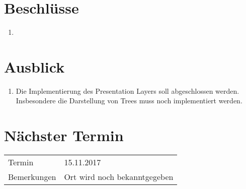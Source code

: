 \documentclass[11pt, a4paper,oneside]{scrartcl}
\begin{document}
\section{Beschlüsse}
\begin{enumerate}
	\item 
\end{enumerate}

\section{Ausblick}
\begin{enumerate}
	\item Die Implementierung des Presentation Layers soll abgeschlossen werden. Insbesondere die Darstellung von Trees muss noch implementiert werden.
\end{enumerate}

\section{Nächster Termin}
\begin{tabu} to \linewidth {l X }
	\toprule
	Termin & 15.11.2017  \\
	Bemerkungen & Ort wird noch bekanntgegeben   \\
	\bottomrule
\end{tabu}
\end{document}
